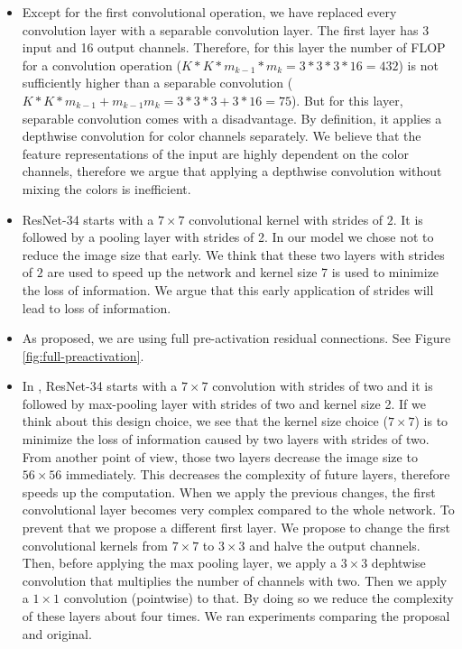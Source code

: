 \begin{itemize}
\item Except for the first convolutional operation, we have replaced every convolution layer with a separable convolution layer. The first layer has 3 input and 16 output channels. Therefore, for this layer the number of FLOP for a convolution operation ($K*K*m_{k-1}*m_k = 3*3*3*16 = 432$) is not sufficiently higher than a separable convolution ($K*K*m_{k-1} + m_{k-1}m_k = 3*3*3 + 3*16=75$). But for this layer, separable convolution comes with a disadvantage. By definition, it applies a depthwise convolution for color channels separately. We believe that the feature representations of the input are highly dependent on the color channels, therefore we argue that applying a depthwise convolution without mixing the colors is inefficient.
\item ResNet-34 starts with a $7 \times 7$ convolutional kernel with strides of $2$. It is followed by a pooling layer with strides of 2. In our model we chose not to reduce the image size that early. We think that these two layers with strides of $2$ are used to speed up the network and kernel size 7 is used to minimize the loss of information. We argue that this early application of strides will lead to loss of information. 
\item As \cite{he2016identity} proposed, we are using full pre-activation residual connections. See Figure \ref{fig:full-preactivation}.
\item In \cite{He:2015aa}, ResNet-34 starts with a $7 \times 7$ convolution with strides of two and it is followed by max-pooling layer with strides of two and kernel size 2. If we think about this design choice, we see that the kernel size choice ($7 \times 7$) is to minimize the loss of information caused by two layers with strides of two. From another point of view, those two layers decrease the image size to $56 \times 56$ immediately. This decreases the complexity of future layers, therefore speeds up the computation. When we apply the previous changes, the first convolutional layer becomes very complex compared to the whole network. To prevent that we propose a different first layer. We propose to change the first convolutional kernels from $7 \times 7$ to $3 \times 3$ and halve the output channels. Then, before applying the max pooling layer, we apply a $3 \times 3$ dephtwise convolution that multiplies the number of channels with two. Then we apply a $1 \times 1$ convolution (pointwise) to that.  By doing so we reduce the complexity of these layers about four times. We ran experiments comparing the proposal and original.
\end{itemize}

